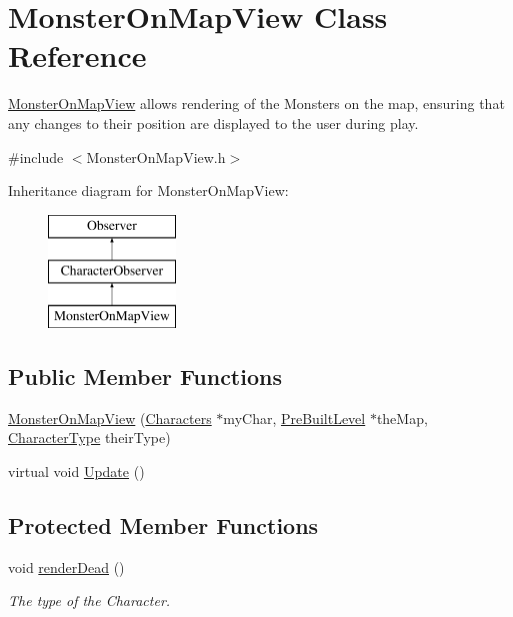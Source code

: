 \hypertarget{class_monster_on_map_view}{}\section{Monster\+On\+Map\+View Class Reference}
\label{class_monster_on_map_view}


\hyperlink{class_monster_on_map_view}{Monster\+On\+Map\+View} allows rendering of the Monsters on the map, ensuring that any changes to their position are displayed to the user during play.  




{\ttfamily \#include $<$Monster\+On\+Map\+View.\+h$>$}

Inheritance diagram for Monster\+On\+Map\+View\+:\begin{figure}[H]
\begin{center}
\leavevmode
\includegraphics[height=3.000000cm]{class_monster_on_map_view}
\end{center}
\end{figure}
\subsection*{Public Member Functions}
\begin{DoxyCompactItemize}
\item 
\hyperlink{class_monster_on_map_view_a52f838a3d411108d54b648879d3174ee}{Monster\+On\+Map\+View} (\hyperlink{class_characters}{Characters} $\ast$my\+Char, \hyperlink{class_pre_built_level}{Pre\+Built\+Level} $\ast$the\+Map, \hyperlink{namespaces_8h_ad0cd52c7c9b13be13f9aafebd2e1c860}{Character\+Type} their\+Type)
\item 
virtual void \hyperlink{class_monster_on_map_view_a033dc1facbc3fcda212e1f5ed7cd668b}{Update} ()
\end{DoxyCompactItemize}
\subsection*{Protected Member Functions}
\begin{DoxyCompactItemize}
\item 
\hypertarget{class_monster_on_map_view_af45d5a264be4977616bb865d8221f9a4}{}\label{class_monster_on_map_view_af45d5a264be4977616bb865d8221f9a4} 
void \hyperlink{class_monster_on_map_view_af45d5a264be4977616bb865d8221f9a4}{render\+Dead} ()
\begin{DoxyCompactList}\small\item\em The type of the Character. \end{DoxyCompactList}\end{DoxyCompactItemize}
